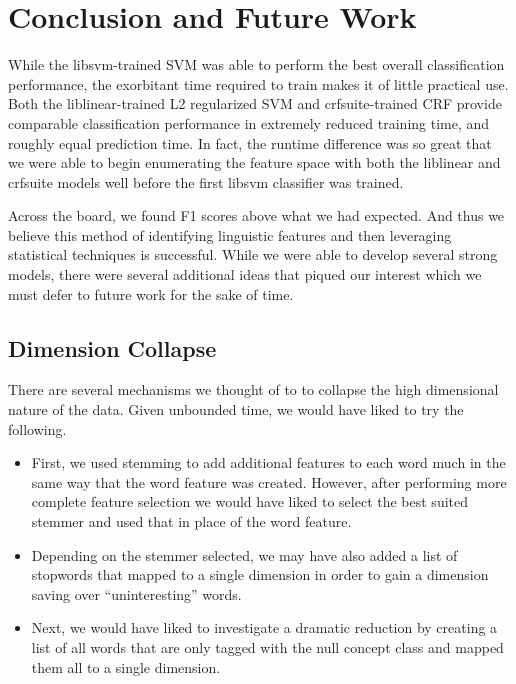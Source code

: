 \documentclass[preprint]{style}
\begin{document}
\section{Conclusion and Future Work}
While the libsvm-trained SVM was able to perform the best overall classification performance, the exorbitant time required to train makes it of little practical use. Both the liblinear-trained L2 regularized SVM and crfsuite-trained CRF provide comparable classification performance in extremely reduced training time, and roughly equal prediction time. In fact, the runtime difference was so great that we were able to begin enumerating the feature space with both the liblinear and crfsuite models well before the first libsvm classifier was trained.

Across the board, we found F1 scores above what we had expected. And thus we believe this method of identifying linguistic features and then leveraging statistical techniques is successful. While we were able to develop several strong models, there were several additional ideas that piqued our interest which we must defer to future work for the sake of time.

\subsection{Dimension Collapse}
There are several mechanisms we thought of to to collapse the high dimensional nature of the data. Given unbounded time, we would have liked to try the following.

\begin{itemize}
\item First, we used stemming to add additional features to each word much in the same way that the word feature was created. However, after performing more complete feature selection we would have liked to select the best suited stemmer and used that in place of the word feature.

\item Depending on the stemmer selected, we may have also added a list of stopwords that mapped to a single dimension in order to gain a dimension saving over ``uninteresting'' words.

\item Next, we would have liked to investigate a dramatic reduction by creating a list of all words that are only tagged with the null concept class and mapped them all to a single dimension.
\end{itemize}
\end{document}
